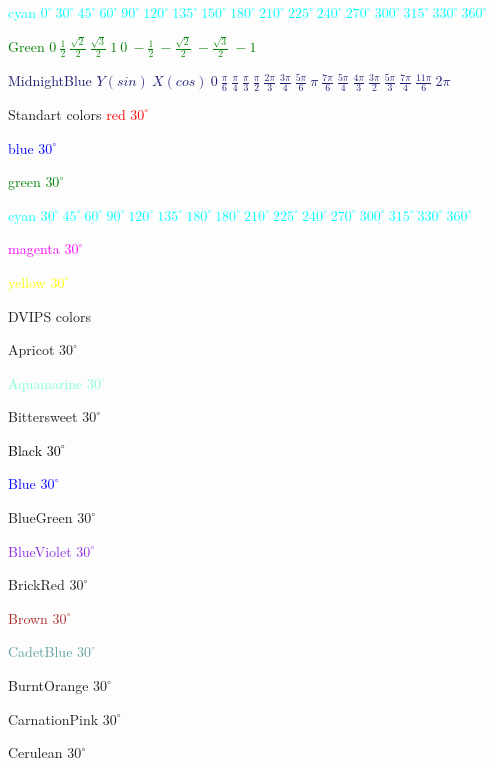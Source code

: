 \documentclass[12pt,a4paper]{article}
\begin{document}
\textcolor{cyan}{cyan $0^\circ \ 30^\circ \ 45^\circ \ 60^\circ \ 90^\circ \ 120^\circ \ 135^\circ \ 150^\circ \ 180^\circ \ 210^\circ \ 225^\circ \ 240^\circ \ 270^\circ \ 300^\circ \ 315^\circ \ 330^\circ \ 360^\circ \ $ }

\bigskip
\textcolor{Green}{Green $0 \ \frac{1}{2} \ \frac{\sqrt{2}}{2} \ \frac{\sqrt{3}}{2} \ 1 \ 0 \ -\!\frac{1}{2} \ -\!\frac{\sqrt{2}}{2} \ -\!\frac{\sqrt{3}}{2} \ -\!1$}

\bigskip
\textcolor{MidnightBlue}{MidnightBlue $Y (sin) \ X (cos) \ 0 \ \frac{\pi}{6} \ \frac{\pi}{4} \ \frac{\pi}{3} \ \frac{\pi}{2} \ \frac{2\pi}{3} \ \frac{3\pi}{4} \ \frac{5\pi}{6} \ \pi \ \frac{7\pi}{6} \ \frac{5\pi}{4} \ \frac{4\pi}{3} \ \frac{3\pi}{2} \ \frac{5\pi}{3} \ \frac{7\pi}{4} \ \frac{11\pi}{6} \ 2\pi$}

\bigskip
Standart colors
\textcolor{red}{red $30^\circ$}

\textcolor{blue}{blue $30^\circ$}

\textcolor{green}{green $30^\circ$}

\textcolor{cyan}{cyan $30^\circ \ 45^\circ \ 60^\circ \ 90^\circ \ 120^\circ \ 135^\circ \ 180^\circ \ 180^\circ \ 210^\circ \ 225^\circ \ 240^\circ \ 270^\circ \ 300^\circ \ 315^\circ \ 330^\circ \ 360^\circ \ $ }

\textcolor{magenta}{magenta $30^\circ$}

\textcolor{yellow}{yellow $30^\circ$}

\bigskip
DVIPS colors

\textcolor{Apricot}{Apricot $30^\circ$}

\textcolor{Aquamarine}{Aquamarine $30^\circ$}

\textcolor{Bittersweet}{Bittersweet $30^\circ$}

\textcolor{Black}{Black $30^\circ$}

\textcolor{Blue}{Blue $30^\circ$}

\textcolor{BlueGreen}{BlueGreen $30^\circ$}

\textcolor{BlueViolet}{BlueViolet $30^\circ$}

\textcolor{BrickRed}{BrickRed $30^\circ$}

\textcolor{Brown}{Brown $30^\circ$}

\textcolor{CadetBlue}{CadetBlue $30^\circ$}

\textcolor{BurntOrange}{BurntOrange $30^\circ$}

\textcolor{CarnationPink}{CarnationPink $30^\circ$}

\textcolor{Cerulean}{Cerulean $30^\circ$}
\end{document}

